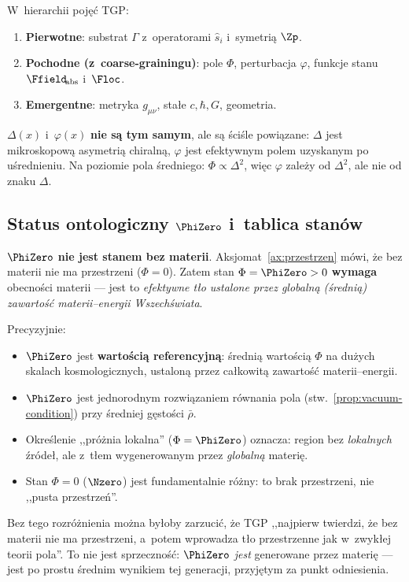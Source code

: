 \begin{remark}\label{rem:co-pierwotne}
W~hierarchii poj\k{e}\'c TGP:
\begin{enumerate}[nosep]
  \item \textbf{Pierwotne}: substrat $\Gamma$ z~operatorami
    $\hat{s}_i$ i~symetri\k{a} $\Zp$.
  \item \textbf{Pochodne (z~coarse-grainingu)}: pole $\Phi$,
    perturbacja $\varphi$, funkcje stanu $\Ffield_{\!\mathrm{abs}}$
    i~$\Floc$.
  \item \textbf{Emergentne}: metryka $g_{\mu\nu}$, sta\l{}e
    $c,\hbar,G$, geometria.
\end{enumerate}
$\Delta(x)$ i~$\varphi(x)$ \textbf{nie s\k{a} tym samym}, ale
s\k{a} \'sci\'sle powi\k{a}zane: $\Delta$ jest mikroskopow\k{a}
asymetri\k{a} chiralną, $\varphi$ jest efektywnym polem uzyskanym
po u\'srednieniu. Na poziomie pola \'sredniego: $\Phi \propto
\Delta^2$, wi\k{e}c $\varphi$ zale\.zy od $\Delta^2$, ale nie
od znaku $\Delta$.
\end{remark}

\subsection{Status ontologiczny $\PhiZero$ i~tablica stan\'ow}\label{ssec:PhiZero-status}

\begin{remark}\label{rem:PhiZero-status}
$\PhiZero$ \textbf{nie jest stanem bez materii}.
Aksjomat~\ref{ax:przestrzen} m\'owi, \.ze bez materii nie ma
przestrzeni ($\Phi = 0$). Zatem stan $\Phi = \PhiZero > 0$
\textbf{wymaga} obecno\'sci materii --- jest to
\emph{efektywne t\l{}o ustalone przez globaln\k{a}
(\'sredni\k{a}) zawarto\'s\'c materii--energii Wszech\'swiata}.

Precyzyjnie:
\begin{itemize}[nosep]
  \item $\PhiZero$ jest \textbf{warto\'sci\k{a} referencyjn\k{a}}:
    \'sredni\k{a} warto\'sci\k{a} $\Phi$ na du\.zych skalach
    kosmologicznych, ustaloną przez ca\l{}kowit\k{a} zawarto\'s\'c
    materii--energii.
  \item $\PhiZero$ jest jednorodnym rozwi\k{a}zaniem r\'ownania
    pola (stw.~\ref{prop:vacuum-condition}) przy \'sredniej
    g\k{e}sto\'sci $\bar{\rho}$.
  \item Okre\'slenie ,,pr\'o\.znia lokalna'' ($\Phi = \PhiZero$)
    oznacza: region bez \emph{lokalnych} \'zr\'ode\l{}, ale
    z~t\l{}em wygenerowanym przez \emph{globaln\k{a}} materi\k{e}.
  \item Stan $\Phi = 0$ ($\Nzero$) jest fundamentalnie
    r\'o\.zny: to brak przestrzeni, nie ,,pusta przestrze\'n''.
\end{itemize}
Bez tego rozr\'o\.znienia mo\.zna by\l{}oby zarzuci\'c, \.ze TGP
,,najpierw twierdzi, \.ze bez materii nie ma przestrzeni,
a~potem wprowadza t\l{}o przestrzenne jak w~zwyk\l{}ej teorii
pola''. To nie jest sprzeczno\'s\'c: $\PhiZero$ \emph{jest}
generowane przez materi\k{e} --- jest po prostu \'srednim
wynikiem tej generacji, przyj\k{e}tym za punkt odniesienia.
\end{remark}

